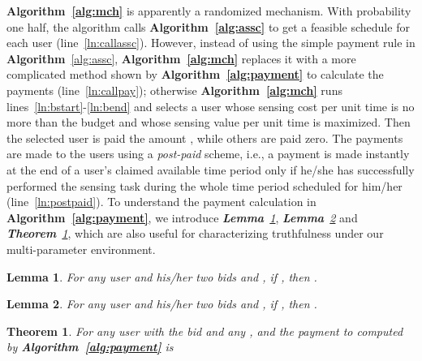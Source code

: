 \documentclass[10pt,journal,compsoc]{IEEEtran}
\newtheorem{theorem}{\textbf{Theorem}}
\newtheorem{lemma}{\textbf{Lemma}}
\begin{document}
  \textbf{Algorithm~\ref{alg:mch}} is apparently a randomized mechanism. With probability one half, the algorithm calls \textbf{Algorithm~\ref{alg:assc}} to get a feasible schedule for each user (line~\ref{ln:callassc}). However, instead of using the simple payment rule in \textbf{Algorithm}~\ref{alg:assc}, \textbf{Algorithm~\ref{alg:mch}} replaces it with a more complicated method shown by \textbf{Algorithm~\ref{alg:payment}} to calculate the payments (line~\ref{ln:callpay}); otherwise \textbf{Algorithm~\ref{alg:mch}} runs lines~\ref{ln:bstart}-\ref{ln:bend} and selects a user whose sensing cost per unit time is no more than the budget and whose sensing value per unit time is maximized. Then the selected user is paid the amount , while others are paid zero. The payments are made to the users using a \textit{post-paid} scheme, i.e., a payment is made instantly at the end of a user's claimed available time period only if he/she has successfully performed the sensing task during the whole time period scheduled for him/her (line~\ref{ln:postpaid}). To understand the payment calculation in \textbf{Algorithm~\ref{alg:payment}}, we introduce \textit{\textbf{Lemma}~\ref{lma:largevalueisless}}, \textit{\textbf{Lemma}~\ref{lma:smallintervalisless}} and \textit{\textbf{Theorem}~\ref{thm:payment}}, which are also useful for characterizing truthfulness under our multi-parameter environment. \begin{lemma}
    For any user  and his/her two bids  and , if , then .
    \label{lma:largevalueisless}
  \end{lemma}
\begin{lemma}
    For any user  and his/her two bids  and , if , then .
    \label{lma:smallintervalisless}
  \end{lemma}
\begin{theorem}
    For any user  with the bid  and any ,  and the payment to  computed by \textbf{Algorithm~\ref{alg:payment}} is
      
    \label{thm:payment}
  \end{theorem}
\end{document}
